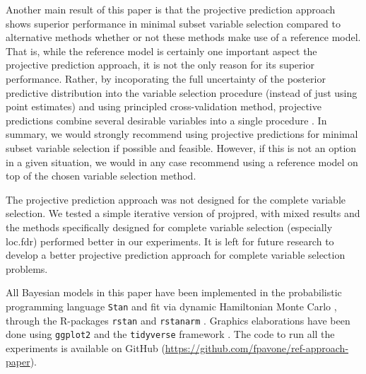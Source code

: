 \documentclass[a4]{article}
\theoremstyle{definition}
\begin{document}
Another main result of this paper is that the projective prediction
approach shows superior performance in minimal subset variable
selection compared to alternative methods whether or not these methods
make use of a reference model. That is, while the reference model is
certainly one important aspect the projective prediction approach, it
is not the only reason for its superior performance.  Rather, by
incoporating the full uncertainty of the posterior predictive
distribution into the variable selection procedure (instead of just
using point estimates) and using principled cross-validation method,
projective predictions combine several desirable variables into a
single procedure \citep{paper:projpred}.  In summary, we would
strongly recommend using projective predictions for minimal subset
 variable selection if possible and feasible. 
 However, if this is not an option in a given
situation, we would in any case recommend using a reference model on
top of the chosen variable selection method.

The projective prediction approach was not designed for the complete
variable selection. We tested a simple iterative version of projpred,
with mixed results and the methods specifically designed for complete
variable selection (especially loc.fdr) performed better in our
experiments. It is left for future research to develop 
a better projective prediction approach for complete variable
selection problems.

All Bayesian models in this paper have been implemented in
the probabilistic programming language \texttt{Stan}
\citep{paper:stan} and fit via dynamic Hamiltonian Monte Carlo
\citep{hoffman2014no,betancourt2017conceptual}, through the R-packages 
\texttt{rstan} \citep{Rrstan} and \texttt{rstanarm} \citep{Rrstanarm}.
Graphics elaborations have been done using \texttt{ggplot2} \citep{Rggplot2}
and the \texttt{tidyverse} framework \citep{Rtidyverse}.
The code to run all
the experiments is available on GitHub
(\url{https://github.com/fpavone/ref-approach-paper}).

 


\appendix

\end{document}
